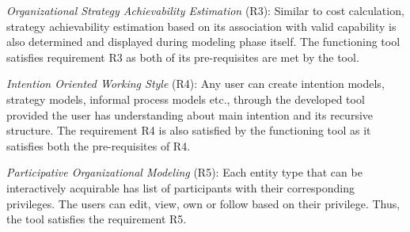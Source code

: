 \textit{Organizational Strategy Achievability Estimation} (R3): Similar to cost calculation, strategy achievability estimation based on its association with valid capability is also determined and displayed during modeling phase itself. The functioning tool satisfies requirement R3 as both of its pre-requisites are met by the tool.

\textit{Intention Oriented Working Style} (R4): Any user can create intention models, strategy models, informal process models etc., through the developed tool provided the user has understanding about main intention and its recursive structure. The requirement R4 is also satisfied by the functioning tool as it satisfies both the pre-requisites of R4.

\textit{Participative Organizational Modeling} (R5): Each entity type that can be interactively acquirable has list of participants with their corresponding privileges. The users can edit, view, own or follow based on their privilege. Thus, the tool satisfies the requirement R5.

